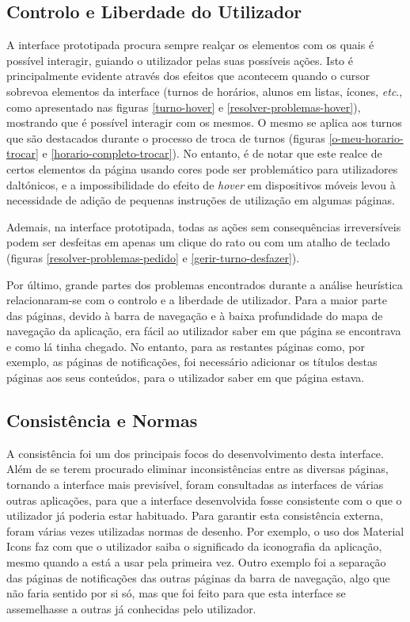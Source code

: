 \documentclass[12pt, a4paper]{article}
\begin{document}
\subsection{Controlo e Liberdade do Utilizador}

A interface prototipada procura sempre realçar os elementos com os quais é possível interagir,
guiando o utilizador pelas suas possíveis ações. Isto é principalmente evidente através dos
efeitos que acontecem quando o cursor sobrevoa elementos da interface (turnos de horários,
alunos em listas, ícones, \emph{etc}., como apresentado nas figuras \ref{turno-hover} e
\ref{resolver-problemas-hover}), mostrando que é possível interagir com os mesmos. O mesmo se aplica
aos turnos que são destacados durante o processo de troca de turnos (figuras
\ref{o-meu-horario-trocar} e \ref{horario-completo-trocar}). No entanto, é de notar que este realce
de certos elementos da página usando cores pode ser problemático para utilizadores daltónicos, e a
impossibilidade do efeito de \emph{hover} em dispositivos móveis levou à necessidade de adição de
pequenas instruções de utilização em algumas páginas.

Ademais, na interface prototipada, todas as ações sem consequências irreversíveis podem ser
desfeitas em apenas um clique do rato ou com um atalho de teclado (figuras
\ref{resolver-problemas-pedido} e \ref{gerir-turno-desfazer}).

Por último, grande partes dos problemas encontrados durante a análise heurística relacionaram-se com
o controlo e a liberdade de utilizador. Para a maior parte das páginas, devido à barra de navegação
e à baixa profundidade do mapa de navegação da aplicação, era fácil ao utilizador saber em que
página se encontrava e como lá tinha chegado. No entanto, para as restantes páginas como, por
exemplo, as páginas de notificações, foi necessário adicionar os títulos destas páginas aos seus
conteúdos, para o utilizador saber em que página estava.

\subsection{Consistência e Normas}

A consistência foi um dos principais focos do desenvolvimento desta interface. Além de se terem
procurado eliminar inconsistências entre as diversas páginas, tornando a interface mais previsível,
foram consultadas as interfaces de várias outras aplicações, para que a interface desenvolvida
fosse consistente com o que o utilizador já poderia estar habituado. Para garantir esta consistência
externa, foram várias vezes utilizadas normas de desenho. Por exemplo, o uso dos Material Icons
\cite{material-icons} faz com que o utilizador saiba o significado da iconografia da aplicação,
mesmo quando a está a usar pela primeira vez. Outro exemplo foi a separação das páginas de
notificações das outras páginas da barra de navegação, algo que não faria sentido por si só, mas que
foi feito para que esta interface se assemelhasse a outras já conhecidas pelo utilizador.
\end{document}
